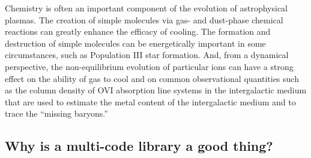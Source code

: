 Chemistry is often an important component of the evolution of
astrophysical plasmas.  The creation of simple molecules via gas- and
dust-phase chemical reactions can greatly enhance the efficacy of
cooling.  The
formation and destruction of simple molecules can be energetically
important in some circumstances, such as Population III star
formation.   And, from a dynamical perspective,
the non-equilibrium evolution of particular ions can have a strong
effect on the ability of gas to cool  and
on common observational quantities such as the column density of OVI
absorption line systems in the intergalactic medium that are used to
estimate the metal content of the intergalactic medium and to trace
the ``missing baryons.''   

\subsection{Why is a multi-code library a good thing?}
